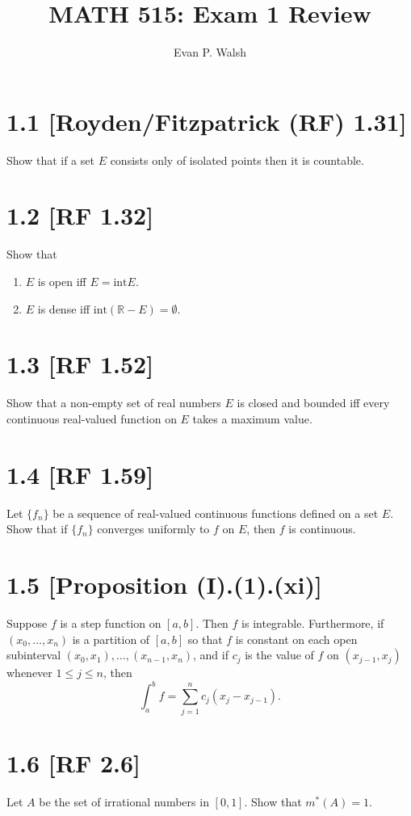 \documentclass[12pt]{article}
\title{MATH 515: Exam 1 Review}
\author{Evan P. Walsh}
\begin{document}


\section*{1.1 [Royden/Fitzpatrick (RF) 1.31]} Show that if a set $E$ consists only of
isolated points then it is countable.


\section*{1.2 [RF 1.32]} 
Show that 
\begin{enumerate}[label=(\roman*)]
\item $E$ is open iff $E = \text{int} E$.
\item $E$ is dense iff $\text{int} (\mathbb{R} - E) = \emptyset$.
\end{enumerate}

\section*{1.3 [RF 1.52]} Show that a non-empty set of real numbers $E$ is closed and
bounded iff every continuous real-valued function on $E$ takes a maximum value.


\section*{1.4 [RF 1.59]} Let $\{f_{n}\}$ be a sequence of real-valued continuous
functions defined on a set $E$. Show that if $\{f_{n}\}$ converges uniformly to $f$ on
$E$, then $f$ is continuous.


\section*{1.5 [Proposition (I).(1).(xi)]} 
Suppose $f$ is a step function on $[a,b]$.
Then $f$ is integrable. Furthermore, if $(x_{0}, \dots, x_{n})$ is a partition
of $[a,b]$ so that $f$ is constant on each open subinterval $(x_{0}, x_{1}),
\dots, (x_{n-1}, x_{n})$, and if $c_{j}$ is the value of $f$ on $(x_{j-1},
x_{j})$ whenever $1 \leq j \leq n$, then 
\[ \int_{a}^{b} f = \sum_{j=1}^{n}c_{j}(x_{j} - x_{j-1}). \]


\section*{1.6 [RF 2.6]} 
Let $A$ be the set of irrational numbers in $[0,1]$. Show
that $m^{*}(A) = 1$.
\end{document}
